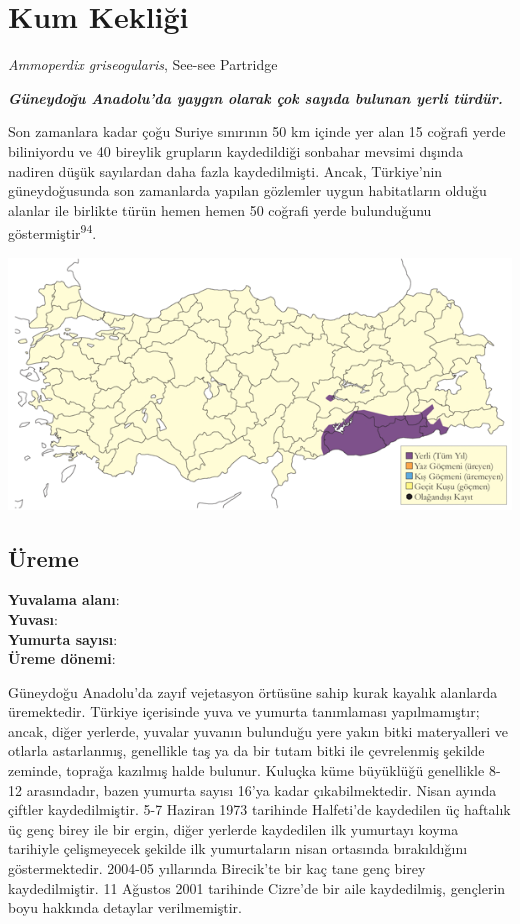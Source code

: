 \documentclass[
  letterpaper,
  DIV=11,
  numbers=noendperiod]{scrreprt}
\begin{document}
\section{Kum Kekliği}\label{kum-kekliux11fi}

\emph{Ammoperdix griseogularis}, See-see Partridge

\textbf{\emph{Güneydoğu Anadolu'da yaygın olarak çok sayıda bulunan
yerli türdür.}}

Son zamanlara kadar çoğu Suriye sınırının 50 km içinde yer alan 15
coğrafi yerde biliniyordu ve 40 bireylik grupların kaydedildiği sonbahar
mevsimi dışında nadiren düşük sayılardan daha fazla kaydedilmişti.
Ancak, Türkiye'nin güneydoğusunda son zamanlarda yapılan gözlemler uygun
habitatların olduğu alanlar ile birlikte türün hemen hemen 50 coğrafi
yerde bulunduğunu göstermiştir\textsuperscript{94}.

\includegraphics{images/harita_Page_040.png}

\subsection{\texorpdfstring{\textbf{Üreme}}{Üreme}}\label{uxfcreme-4}

\textbf{Yuvalama alanı}:\\
\textbf{Yuvası}:\\
\textbf{Yumurta sayısı}:\\
\textbf{Üreme dönemi}:

Güneydoğu Anadolu'da zayıf vejetasyon örtüsüne sahip kurak kayalık
alanlarda üremektedir. Türkiye içerisinde yuva ve yumurta tanımlaması
yapılmamıştır; ancak, diğer yerlerde, yuvalar yuvanın bulunduğu yere
yakın bitki materyalleri ve otlarla astarlanmış, genellikle taş ya da
bir tutam bitki ile çevrelenmiş şekilde zeminde, toprağa kazılmış halde
bulunur. Kuluçka küme büyüklüğü genellikle 8-12 arasındadır, bazen
yumurta sayısı 16'ya kadar çıkabilmektedir. Nisan ayında çiftler
kaydedilmiştir. 5-7 Haziran 1973 tarihinde Halfeti'de kaydedilen üç
haftalık üç genç birey ile bir ergin, diğer yerlerde kaydedilen ilk
yumurtayı koyma tarihiyle çelişmeyecek şekilde ilk yumurtaların nisan
ortasında bırakıldığını göstermektedir. 2004-05 yıllarında Birecik'te
bir kaç tane genç birey kaydedilmiştir. 11 Ağustos 2001 tarihinde
Cizre'de bir aile kaydedilmiş, gençlerin boyu hakkında detaylar
verilmemiştir.
\end{document}
